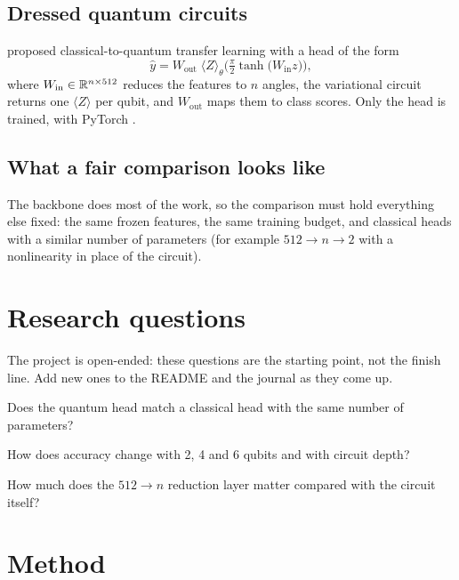 \documentclass[11pt,a4paper]{article}
\begin{document}
\subsection{Dressed quantum circuits}
\citet{mari2020} proposed classical-to-quantum transfer learning with a head of the form
\begin{equation}
  \hat y=W_{\text{out}}\;\big\langle Z\big\rangle_\theta\!\Big(\tfrac{\pi}{2}\tanh\big(W_{\text{in}}z\big)\Big),
\end{equation}
where $W_{\text{in}}\in\mathbb{R}^{n\times512}$ reduces the features to $n$ angles, the variational circuit
returns one $\langle Z\rangle$ per qubit, and $W_{\text{out}}$ maps them to class scores. Only the head is
trained, with PyTorch \citep{paszke2019}.

\subsection{What a fair comparison looks like}
The backbone does most of the work, so the comparison must hold everything else fixed: the same
frozen features, the same training budget, and classical heads with a similar number of parameters
(for example $512\to n\to2$ with a nonlinearity in place of the circuit).

\section{Research questions}
The project is open-ended: these questions are the starting point, not the finish line. Add new
ones to the README and the journal as they come up.

\begin{rqlist}
  \item Does the quantum head match a classical head with the same number of parameters?
  \item How does accuracy change with 2, 4 and 6 qubits and with circuit depth?
  \item How much does the $512\to n$ reduction layer matter compared with the circuit itself?
\end{rqlist}

\section{Method}
\end{document}
